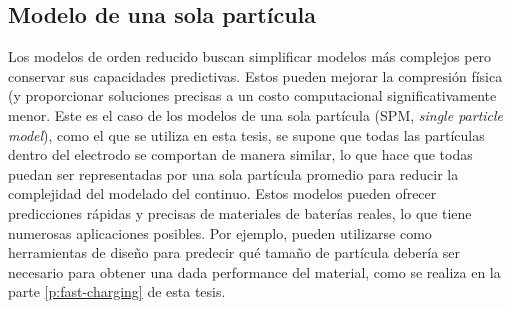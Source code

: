 \subsection{Modelo de una sola partícula}\label{s:metodologia}

Los modelos de orden reducido buscan simplificar modelos más complejos pero 
conservar sus capacidades predictivas. Estos pueden mejorar la compresión física 
(y proporcionar soluciones precisas a un costo computacional significativamente menor.
Este es el caso de los modelos de una sola partícula (SPM, \textit{single particle 
model}), como el que se utiliza en esta tesis, se supone que todas las partículas
dentro del electrodo se comportan de manera similar, lo que hace que todas puedan ser 
representadas por una sola partícula promedio para reducir la complejidad del 
modelado del continuo. Estos modelos pueden ofrecer predicciones rápidas y precisas 
de materiales de baterías reales, lo que tiene numerosas aplicaciones posibles. Por ejemplo, pueden 
utilizarse como herramientas de diseño para 
predecir qué tamaño de partícula debería ser necesario para obtener una dada 
performance del material, como se realiza en la parte \ref{p:fast-charging} de 
esta tesis.

